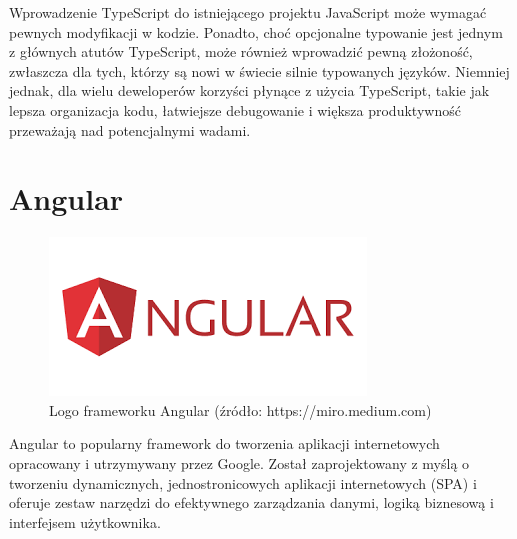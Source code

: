 Wprowadzenie TypeScript do istniejącego projektu JavaScript może wymagać pewnych modyfikacji w kodzie. Ponadto, choć opcjonalne typowanie jest jednym z głównych atutów TypeScript, może również wprowadzić pewną złożoność, zwłaszcza dla tych, którzy są nowi w świecie silnie typowanych języków. Niemniej jednak, dla wielu deweloperów korzyści płynące z użycia TypeScript, takie jak lepsza organizacja kodu, łatwiejsze debugowanie i większa produktywność przeważają nad potencjalnymi wadami\cite{typescriptSpecs}.

\section{Angular}
\begin{figure}[h]
    \centering
    \includegraphics[width=0.6\linewidth]{./img/angular.png}
    \caption{Logo frameworku Angular (źródło: https://miro.medium.com)}
    \label{fig:Angular}
\end{figure}
Angular to popularny framework do tworzenia aplikacji internetowych opracowany i utrzymywany przez Google. Został zaprojektowany z myślą o tworzeniu dynamicznych, jednostronicowych aplikacji internetowych (SPA) i oferuje zestaw narzędzi do efektywnego zarządzania danymi, logiką biznesową i interfejsem użytkownika.

